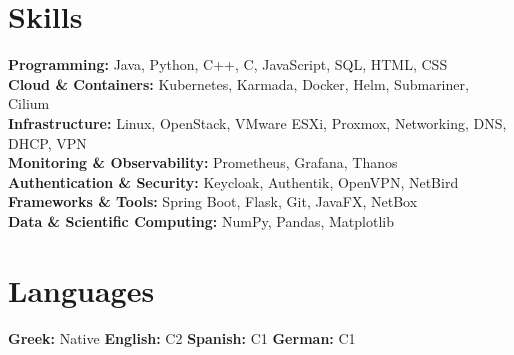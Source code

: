 \documentclass[11pt]{article}       %
\begin{document}

\vspace{-18.5pt}

\section*{Skills}

\textbf{Programming:} Java, Python, C++, C, JavaScript, SQL, HTML, CSS \\
\textbf{Cloud \& Containers:} Kubernetes, Karmada, Docker, Helm, Submariner, Cilium \\
\textbf{Infrastructure:} Linux, OpenStack, VMware ESXi, Proxmox, Networking, DNS, DHCP, VPN \\
\textbf{Monitoring \& Observability:} Prometheus, Grafana, Thanos \\
\textbf{Authentication \& Security:} Keycloak, Authentik, OpenVPN, NetBird \\
\textbf{Frameworks \& Tools:} Spring Boot, Flask, Git, JavaFX, NetBox \\
\textbf{Data \& Scientific Computing:} NumPy, Pandas, Matplotlib \\

\vspace{-10pt}

\section*{Languages}

\textbf{Greek:} Native \hspace{1em}
\textbf{English:} C2 \hspace{1em}
\textbf{Spanish:} C1 \hspace{1em}
\textbf{German:} C1
\end{document}
